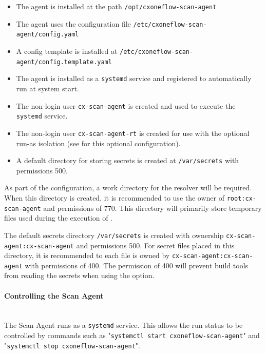 \begin{itemize}
  \item The agent is installed at the path \texttt{/opt/cxoneflow-scan-agent}
  \item The agent uses the configuration file \texttt{/etc/cxoneflow-scan-agent/config.yaml}
  \item A config template is installed at \texttt{/etc/cxoneflow-scan-agent/config.template.yaml}
  \item The agent is installed as a \texttt{systemd} service and registered to automatically run at system start.
  \item The non-login user \texttt{cx-scan-agent} is created and used to execute the \texttt{systemd} service.
  \item The non-login user \texttt{cx-scan-agent-rt} is created for use with the optional run-as isolation
    (see  for this optional configuration).
  \item A default directory for storing secrets is created at \texttt{/var/secrets} with permissions 500.
\end{itemize}

As part of the configuration, a work directory for the resolver will be required.  When this directory
is created, it is recommended to use the owner of \texttt{root:cx-scan-agent} and permissions of 770.  This
directory will primarily store temporary files used during the execution of \scaresolver.

The default secrets directory \texttt{/var/secrets} is created with ownership \texttt{cx-scan-agent:cx-scan-agent} and
permissions 500.  For secret files placed in this directory, it is recommended to each file is owned
by \texttt{cx-scan-agent:cx-scan-agent} with permissions of 400.  The permission of 400 will prevent 
build tools from reading the secrets when using the  option.

\paragraph{Controlling the Scan Agent}
\noindent\\The Scan Agent runs as a \texttt{systemd} service.  This allows the run status to be controlled
by commands such as "\texttt{systemctl start cxoneflow-scan-agent}" and\\"\texttt{systemctl stop cxoneflow-scan-agent}".

